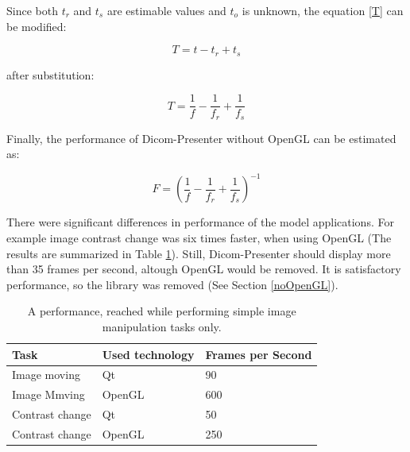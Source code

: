Since both $t_{r}$ and $t_{s}$ are estimable values and $t_{o}$ is unknown, the equation \ref{T} can be modified:

\begin{equation} \label{T}
T = t - t_{r} + t_{s}
\end{equation} 

after substitution:

\begin{equation} \label{T}
T = \frac{1}{f} - \frac{1}{f_{r}} + \frac{1}{f_{s}}
\end{equation} 

Finally, the performance of Dicom-Presenter without OpenGL can be estimated as:

\begin{equation} \label{estimate}
F = \left(\frac{1}{f} - \frac{1}{f_{r}} + \frac{1}{f_{s}}\right)^{-1}
\end{equation}

There were significant differences in performance of the model applications. For example image contrast change was six times faster, when using OpenGL (The results are summarized in Table \ref{results}). Still, Dicom-Presenter should display more than 35 frames per second, altough OpenGL would be removed. It is satisfactory performance, so the library was removed (See Section \ref{noOpenGL}).

\begin{table}
\begin{center}
\caption{A performance, reached while performing simple image manipulation tasks only.\label{results}}
  \begin{tabular}{| l || l | l | }
	\hline
	Task & Used technology  & Frames per Second \\
    \hline \hline
    Image moving & Qt & 90 \\ \hline
    Image Mmving & OpenGL & 600 \\ \hline
    Contrast change & Qt & 50 \\ \hline
	Contrast change & OpenGL & 250 \\
    \hline
  \end{tabular}
  \end{center}
\end{table}




